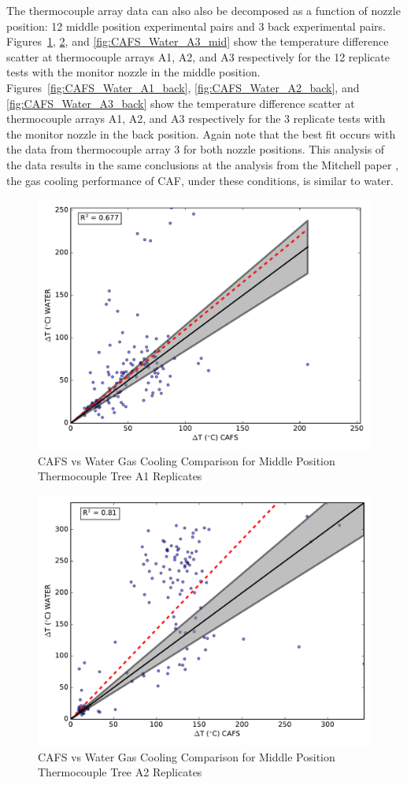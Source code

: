 \documentclass[12pt,oneside]{book}
\begin{document}
\clearpage

The thermocouple array data can also also be decomposed as a function of nozzle position: 12 middle position experimental pairs and 3 back experimental pairs. Figures~\ref{fig:CAFS_Water_A1_mid}, \ref{fig:CAFS_Water_A2_mid}, and \ref{fig:CAFS_Water_A3_mid} show the temperature difference scatter at thermocouple arrays A1, A2, and A3 respectively for the 12 replicate tests with the monitor nozzle in the middle position. Figures~\ref{fig:CAFS_Water_A1_back}, \ref{fig:CAFS_Water_A2_back}, and \ref{fig:CAFS_Water_A3_back} show the temperature difference scatter at thermocouple arrays A1, A2, and A3 respectively for the 3 replicate tests with the monitor nozzle in the back position. Again note that the best fit occurs with the data from thermocouple array 3 for both nozzle positions.  This analysis of the data results in the same conclusions at the analysis from the Mitchell paper \cite{Mitchell:1}, the gas cooling performance of CAF, under these conditions, is similar to water. 

\begin{figure}[!ht]
	\includegraphics[width=.7\columnwidth]{../Figures/Gas_Cooling/Combined_mid_A1_scatter}
	\caption{CAFS vs Water Gas Cooling Comparison for Middle Position Thermocouple Tree A1 Replicates}
	\label{fig:CAFS_Water_A1_mid}
\end{figure}

\begin{figure}[!ht]
	\includegraphics[width=.7\columnwidth]{../Figures/Gas_Cooling/Combined_mid_A2_scatter}
	\caption{CAFS vs Water Gas Cooling Comparison for Middle Position Thermocouple Tree A2 Replicates}
	\label{fig:CAFS_Water_A2_mid}
\end{figure}
\end{document}
